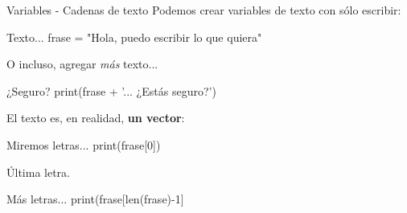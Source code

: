 \begin{frame}[t]{Variables - Cadenas de texto}\vspace{10pt}
Podemos crear variables de texto con sólo escribir:

\begin{block}{Texto...}
	frase = "Hola, puedo escribir lo que quiera"
\end{block}

O incluso, agregar \textit{más} texto...
\begin{block}{¿Seguro?}
	print(frase + '... ¿Estás seguro?')
\end{block}

El texto es, en realidad, \textbf{un vector}:
\begin{block}{Miremos letras...}
	print(frase[0])
\end{block}

Última letra.
\begin{block}{Más letras...}
	print(frase[len(frase)-1]
\end{block}

\end{frame}
